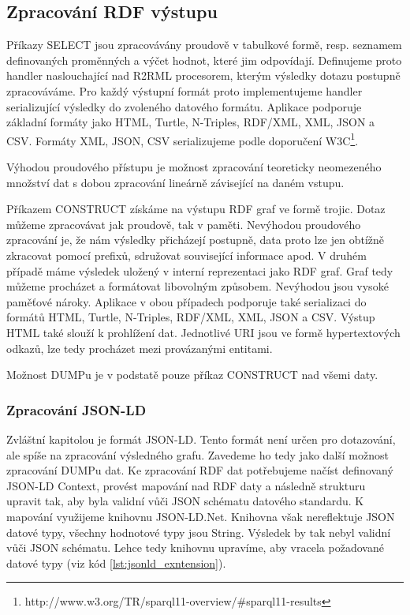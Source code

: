 \subsection{Zpracování RDF výstupu}

Příkazy SELECT jsou zpracovávány proudově v tabulkové formě, resp. seznamem definovaných proměnných a výčet hodnot, které jim odpovídají. Definujeme proto handler naslouchající nad R2RML procesorem, kterým výsledky dotazu postupně zpracováváme. Pro každý výstupní formát proto implementujeme handler serializující výsledky do zvoleného datového formátu. Aplikace podporuje základní formáty jako HTML, Turtle, N-Triples, RDF/XML, XML, JSON a CSV. Formáty XML, JSON, CSV serializujeme podle doporučení W3C\footnote{http://www.w3.org/TR/sparql11-overview/\#sparql11-results}.

Výhodou proudového přístupu je možnost zpracování teoreticky neomezeného množství dat s dobou zpracování lineárně závisející na daném vstupu.

Příkazem CONSTRUCT získáme na výstupu RDF graf ve formě trojic. Dotaz můžeme zpracovávat jak proudově, tak v paměti. Nevýhodou proudového zpracování je, že nám výsledky přicházejí postupně, data proto lze jen obtížně zkracovat pomocí prefixů, sdružovat související informace apod. V druhém případě máme výsledek uložený v interní reprezentaci jako RDF graf. Graf tedy můžeme procházet a formátovat libovolným způsobem. Nevýhodou jsou vysoké paměťové nároky. Aplikace v obou případech podporuje také serializaci do formátů HTML, Turtle, N-Triples, RDF/XML, XML, JSON a CSV. Výstup HTML také slouží k prohlížení dat. Jednotlivé URI jsou ve formě hypertextových odkazů, lze tedy procházet mezi provázanými entitami.

Možnost DUMPu je v podstatě pouze příkaz CONSTRUCT nad všemi daty.

\subsubsection{Zpracování JSON-LD}

Zvláštní kapitolou je formát JSON-LD. Tento formát není určen pro dotazování, ale spíše na zpracování výsledného grafu. Zavedeme ho tedy jako další možnost zpracování DUMPu dat. Ke zpracování RDF dat potřebujeme načíst definovaný JSON-LD Context, provést mapování nad RDF daty a následně strukturu upravit tak, aby byla validní vůči JSON schématu datového standardu. K mapování využijeme knihovnu JSON-LD.Net. Knihovna však nereflektuje JSON datové typy, všechny hodnotové typy jsou String. Výsledek by tak nebyl validní vůči JSON schématu. Lehce tedy knihovnu upravíme, aby vracela požadované datové typy (viz kód \ref{lst:jsonld_exntension}).

